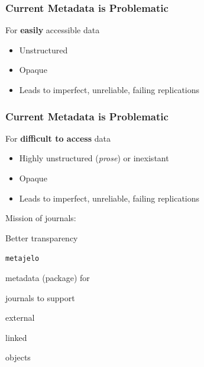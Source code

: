 \begin{frame}
\frametitle{Current Metadata is Problematic}
\begin{block}{For \textbf{easily} accessible data}
	\begin{itemize}
		\item Unstructured
		\item Opaque
		\item Leads to imperfect, unreliable, failing replications
	\end{itemize}
\end{block}
\end{frame}


\begin{frame}
\frametitle{Current Metadata is Problematic}
\begin{block}{For \textbf{difficult to access} data}
	\begin{itemize}
		\item Highly unstructured (\textit{prose}) or inexistant
		\item Opaque
		\item Leads to imperfect, unreliable, failing replications
	\end{itemize}
\end{block}
\end{frame}



\begin{frame}
\begin{center}
	\huge Mission of journals: 
	
	Better transparency
\end{center}
\end{frame}



\begin{frame}
\begin{center}
	\huge \texttt{metajelo}
	
	\normalsize {\color{blue} metadata} (package) for 
	
	{\color{blue}journals}  to support 
	
	\color{blue} external 
	
	linked 
	
	objects
\end{center}
\end{frame}



